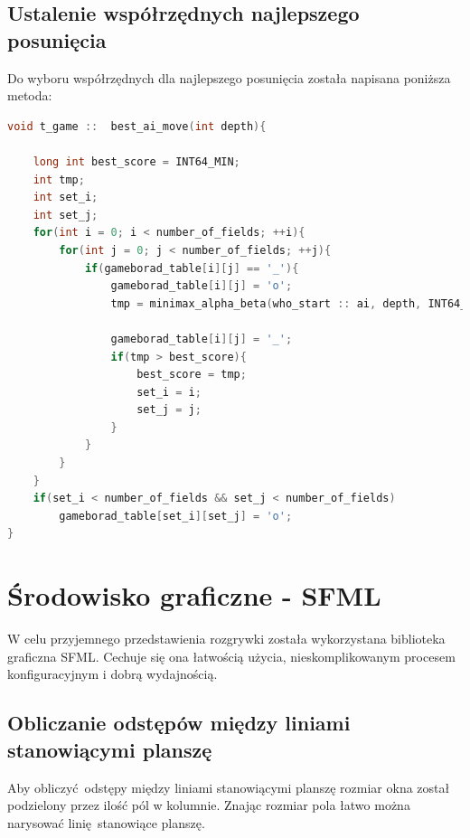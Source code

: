 \documentclass[12pt]{article}
\begin{document}
    \subsection{Ustalenie współrzędnych najlepszego posunięcia}
    Do wyboru współrzędnych dla najlepszego posunięcia została napisana poniższa metoda:
    \begin{lstlisting}[language=C++, caption=best\_ai\_move()]
    void t_game ::  best_ai_move(int depth){

    long int best_score = INT64_MIN;
    int tmp;
    int set_i;
    int set_j;
    for(int i = 0; i < number_of_fields; ++i){
        for(int j = 0; j < number_of_fields; ++j){
            if(gameborad_table[i][j] == '_'){
                gameborad_table[i][j] = 'o';
                tmp = minimax_alpha_beta(who_start :: ai, depth, INT64_MIN, INT64_MAX);

                gameborad_table[i][j] = '_';
                if(tmp > best_score){
                    best_score = tmp;
                    set_i = i;
                    set_j = j;
                }
            }
        }
    }
    if(set_i < number_of_fields && set_j < number_of_fields)
        gameborad_table[set_i][set_j] = 'o';
}

\end{lstlisting}

\section{Środowisko graficzne - SFML}
W celu przyjemnego przedstawienia rozgrywki została wykorzystana biblioteka graficzna SFML.
Cechuje się ona łatwością użycia, nieskomplikowanym procesem konfiguracyjnym i dobrą wydajnością.
\subsection{Obliczanie odstępów między liniami stanowiącymi planszę}

    Aby obliczyć odstępy między liniami stanowiącymi planszę rozmiar okna został podzielony przez 
    ilość pól w kolumnie. Znając rozmiar pola łatwo można narysować linię stanowiące planszę.
\end{document}
